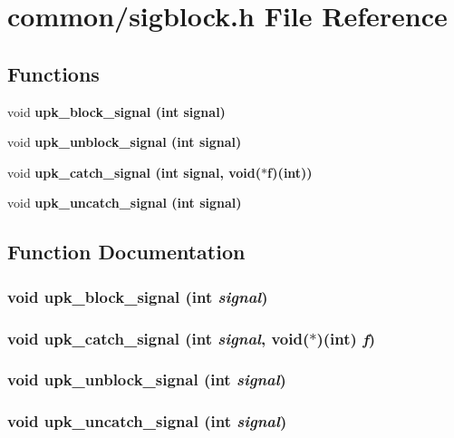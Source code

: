 \section{common/sigblock.h File Reference}
\label{sigblock_8h}
\subsection*{Functions}
\begin{CompactItemize}
\item 
void \bf{upk\_\-block\_\-signal} (int signal)
\item 
void \bf{upk\_\-unblock\_\-signal} (int signal)
\item 
void \bf{upk\_\-catch\_\-signal} (int signal, void($\ast$f)(int))
\item 
void \bf{upk\_\-uncatch\_\-signal} (int signal)
\end{CompactItemize}


\subsection{Function Documentation}
\subsubsection{\setlength{\rightskip}{0pt plus 5cm}void upk\_\-block\_\-signal (int {\em signal})}\label{sigblock_8h_6dfde8bf2e2526a9a2388c56492d29ce}


\subsubsection{\setlength{\rightskip}{0pt plus 5cm}void upk\_\-catch\_\-signal (int {\em signal}, void($\ast$)(int) {\em f})}\label{sigblock_8h_55a99761f4841772cb59aac5f07d4466}


\subsubsection{\setlength{\rightskip}{0pt plus 5cm}void upk\_\-unblock\_\-signal (int {\em signal})}\label{sigblock_8h_77eb01608615602ac0ac56535897d6e4}


\subsubsection{\setlength{\rightskip}{0pt plus 5cm}void upk\_\-uncatch\_\-signal (int {\em signal})}\label{sigblock_8h_2e1bde7aa1f6f853ea31fd4318fab8fb}



